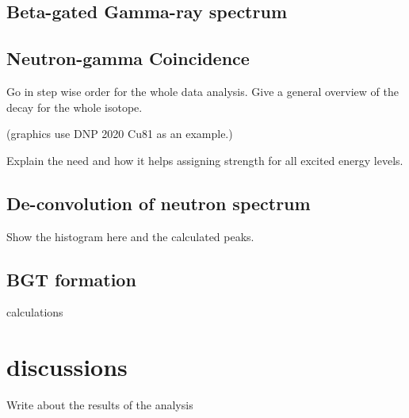 \subsection{Beta-gated Gamma-ray spectrum}
\subsection{Neutron-gamma Coincidence}
Go in step wise order for the whole data analysis.
Give a general overview of the decay for the whole isotope.

(graphics use DNP 2020 Cu81 as an example.)

Explain the need and how it helps assigning strength for all excited energy levels.
\subsection{De-convolution of neutron spectrum}
Show the histogram here and the calculated peaks.

\subsection{BGT formation}
calculations
\section{discussions}

Write about the results of the analysis
\section{}
